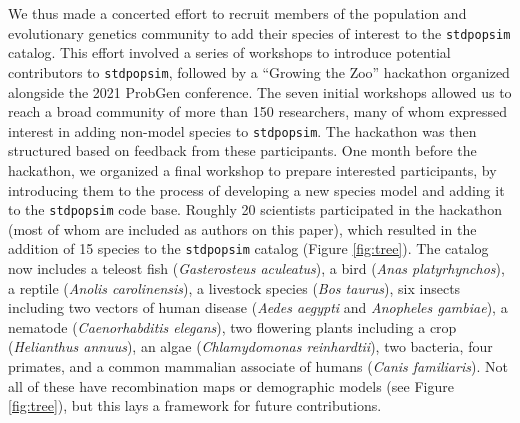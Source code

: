 \documentclass[hidelinks]{article}
\newcommand{\stdpopsim}{\texttt{stdpopsim}\xspace}
\begin{document}
We thus made a concerted effort
to recruit members of the population and evolutionary genetics community
to add their species of interest to the \stdpopsim catalog.
This effort involved a series of workshops to introduce potential contributors to \stdpopsim, followed by a ``Growing the Zoo'' hackathon organized alongside the 2021 ProbGen conference.
The seven initial workshops allowed us to reach a broad community of more than 150 researchers,
many of whom expressed interest in adding non-model species to \stdpopsim.
The hackathon was then structured based on feedback from these participants.
One month before the hackathon, we organized a final workshop to prepare interested
participants, by introducing them to  the process of developing
a new species model and adding it to the \stdpopsim code base.
Roughly 20 scientists participated in the hackathon (most of whom are included as authors on this paper),
which resulted in the addition of 15 species to the \stdpopsim catalog
(Figure \ref{fig:tree}).
The catalog now includes
a teleost fish (\textit{Gasterosteus aculeatus}),
a bird (\textit{Anas platyrhynchos}),
a reptile (\textit{Anolis carolinensis}),
a livestock species (\textit{Bos taurus}),
six insects including two vectors of human disease (\textit{Aedes aegypti} and \textit{Anopheles gambiae}),
a nematode (\textit{Caenorhabditis elegans}),
two flowering plants including a crop (\textit{Helianthus annuus}),
an algae (\textit{Chlamydomonas reinhardtii}),
two bacteria,
four primates, and a common mammalian associate of humans (\textit{Canis familiaris}).
Not all of these have recombination maps or demographic models (see Figure \ref{fig:tree}),
but this lays a framework for future contributions.
\end{document}
